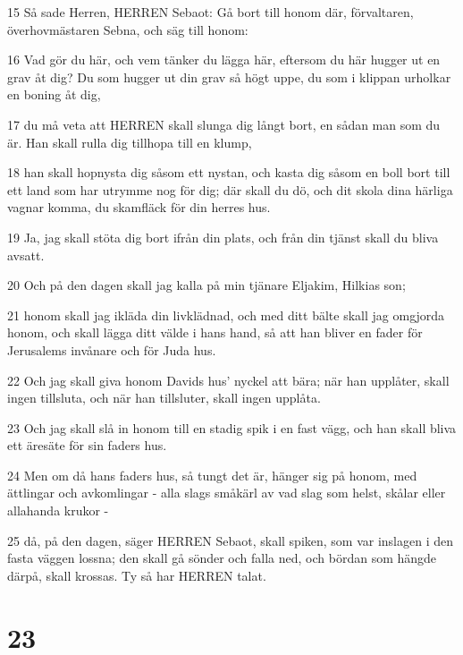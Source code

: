 \par 15 Så sade Herren, HERREN Sebaot: Gå bort till honom där, förvaltaren, överhovmästaren Sebna, och säg till honom:
\par 16 Vad gör du här, och vem tänker du lägga här, eftersom du här hugger ut en grav åt dig? Du som hugger ut din grav så högt uppe, du som i klippan urholkar en boning åt dig,
\par 17 du må veta att HERREN skall slunga dig långt bort, en sådan man som du är. Han skall rulla dig tillhopa till en klump,
\par 18 han skall hopnysta dig såsom ett nystan, och kasta dig såsom en boll bort till ett land som har utrymme nog för dig; där skall du dö, och dit skola dina härliga vagnar komma, du skamfläck för din herres hus.
\par 19 Ja, jag skall stöta dig bort ifrån din plats, och från din tjänst skall du bliva avsatt.
\par 20 Och på den dagen skall jag kalla på min tjänare Eljakim, Hilkias son;
\par 21 honom skall jag ikläda din livklädnad, och med ditt bälte skall jag omgjorda honom, och skall lägga ditt välde i hans hand, så att han bliver en fader för Jerusalems invånare och för Juda hus.
\par 22 Och jag skall giva honom Davids hus' nyckel att bära; när han upplåter, skall ingen tillsluta, och när han tillsluter, skall ingen upplåta.
\par 23 Och jag skall slå in honom till en stadig spik i en fast vägg, och han skall bliva ett äresäte för sin faders hus.
\par 24 Men om då hans faders hus, så tungt det är, hänger sig på honom, med ättlingar och avkomlingar - alla slags småkärl av vad slag som helst, skålar eller allahanda krukor -
\par 25 då, på den dagen, säger HERREN Sebaot, skall spiken, som var inslagen i den fasta väggen lossna; den skall gå sönder och falla ned, och bördan som hängde därpå, skall krossas. Ty så har HERREN talat.

\chapter{23}

